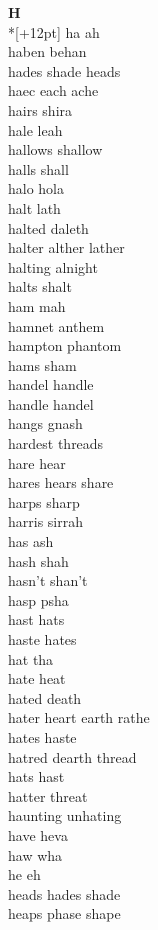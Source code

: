 \vspace{14pt}
\noindent\textbf{\Large H}\\*[+12pt]
ha ah\\
haben behan\\
hades shade heads\\
haec each ache\\
hairs shira\\
hale leah\\
hallows shallow\\
halls shall\\
halo hola\\
halt lath\\
halted daleth\\
halter alther lather\\
halting alnight\\
halts shalt\\
ham mah\\
hamnet anthem\\
hampton phantom\\
hams sham\\
handel handle\\
handle handel\\
hangs gnash\\
hardest threads\\
hare hear\\
hares hears share\\
harps sharp\\
harris sirrah\\
has ash\\
hash shah\\
hasn't shan't\\
hasp psha\\
hast hats\\
haste hates\\
hat tha\\
hate heat\\
hated death\\
hater heart earth rathe\\
hates haste\\
hatred dearth thread\\
hats hast\\
hatter threat\\
haunting unhating\\
have heva\\
haw wha\\
he eh\\
heads hades shade\\
heaps phase shape\\
